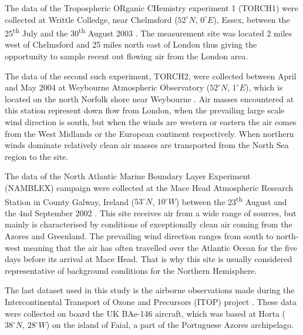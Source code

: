 \documentclass[11pt,a4paper]{article}
\begin{document}
The data of the Tropospheric ORganic CHemistry experiment 1 (TORCH1) were collected at Writtle Colledge, near Chelmsford ($52^\circ N$, $0^\circ E$), Essex, between the 25\textsuperscript{th} July and the 30\textsuperscript{th} August 2003 \citep{Emmerson2007}. The measurement site was located 2 miles west of Chelmsford and 25 miles north east of London thus giving the opportunity to sample recent out flowing air from the London area.

The data of the second such experiment, TORCH2, were collected between April and May 2004 at Weybourne Atmospheric Observatory ($52^\circ N$, $1^\circ E$), which is located on the north Norfolk shore near Weybourne \citep{Gysel2007}. Air masses encountered at this station represent down flow from London, when the prevailing large scale wind direction is south, but when the winds are western or eastern the air comes from the West Midlands or the European continent respectively. When northern winds dominate relatively clean air masses are transported from the North Sea region to the site.

The data of the North Atlantic Marine Boundary Layer Experiment (NAMBLEX) campaign were collected at the Mace Head Atmospheric Research Station in County Galway, Ireland ($53^\circ N$, $10^\circ W$) between the 23\textsuperscript{th} August and the 4nd September 2002 \citep{Heard2006}. This site receives air from a wide range of sources, but mainly is characterised by conditions of exceptionally clean air coming from the Azores and Greenland. The prevailing wind direction ranges from south to north-west meaning that the air has often travelled over the Atlantic Ocean for the five days before its arrival at Mace Head. That is why this site is usually considered representative of background conditions for the Northern Hemisphere.

The last dataset used in this study is the airborne observations made during the Intercontinental Transport of Ozone and Precursors (ITOP) project \citep{Lewis2007b}. These data were collected on board the UK BAe-146 aircraft, which was based at Horta ($38^\circ N$, $28^\circ W$) on the island of Faial, a part of the Portuguese Azores archipelago.
\end{document}
